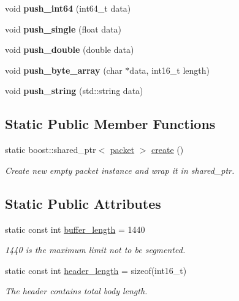 \begin{DoxyCompactItemize}
\mbox{\label{classmedianet_1_1packet_af4f5b81f3c82ee099beabaee482e700d}} 
void {\bfseries push\+\_\+int64} (int64\+\_\+t data)
\item 
\mbox{\label{classmedianet_1_1packet_a8868c9c59546f76246d27febf0d2e91e}} 
void {\bfseries push\+\_\+single} (float data)
\item 
\mbox{\label{classmedianet_1_1packet_ab380dde95295c5e0f41ff899141d35b1}} 
void {\bfseries push\+\_\+double} (double data)
\item 
\mbox{\label{classmedianet_1_1packet_ae128fefd0249d8f2a2cce2e985824d80}} 
void {\bfseries push\+\_\+byte\+\_\+array} (char $\ast$data, int16\+\_\+t length)
\item 
\mbox{\label{classmedianet_1_1packet_a9089767bb1f7e37c69efc8c02ebe4946}} 
void {\bfseries push\+\_\+string} (std\+::string data)
\end{DoxyCompactItemize}
\subsection*{Static Public Member Functions}
\begin{DoxyCompactItemize}
\item 
static boost\+::shared\+\_\+ptr$<$ \mbox{\hyperlink{classmedianet_1_1packet}{packet}} $>$ \mbox{\hyperlink{classmedianet_1_1packet_a294f37745cf25051ac7285481b701caa}{create}} ()
\begin{DoxyCompactList}\small\item\em Create new empty packet instance and wrap it in shared\+\_\+ptr. \end{DoxyCompactList}\end{DoxyCompactItemize}
\subsection*{Static Public Attributes}
\begin{DoxyCompactItemize}
\item 
static const int \mbox{\hyperlink{classmedianet_1_1packet_a9446ace51bb94ea42f48a392fc1290fc}{buffer\+\_\+length}} = 1440
\begin{DoxyCompactList}\small\item\em 1440 is the maximum limit not to be segmented. \end{DoxyCompactList}\item 
static const int \mbox{\hyperlink{classmedianet_1_1packet_aafdea17c1dd88878ae574cc936816451}{header\+\_\+length}} = sizeof(int16\+\_\+t)
\begin{DoxyCompactList}\small\item\em The header contains total body length. \end{DoxyCompactList}\end{DoxyCompactItemize}


